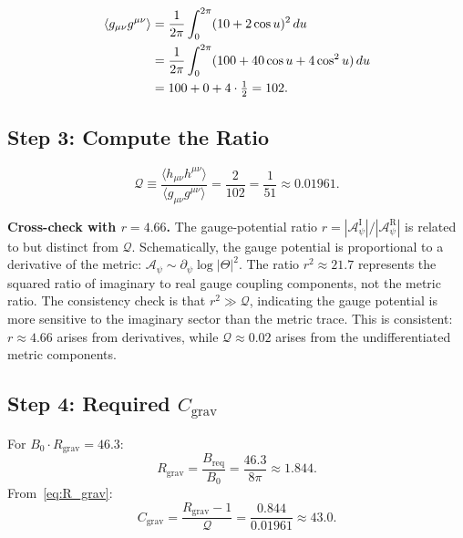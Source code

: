 \documentclass[11pt,a4paper]{article}
\theoremstyle{remark}
\begin{document}
\begin{align}
  \langle g_{\mu\nu}g^{\mu\nu}\rangle
    &= \frac{1}{2\pi}\int_0^{2\pi}(10 + 2\cos u)^2\,du \notag\\
    &= \frac{1}{2\pi}\int_0^{2\pi}(100 + 40\cos u + 4\cos^2 u)\,du \notag\\
    &= 100 + 0 + 4\cdot\tfrac{1}{2} = 102.
  \label{eq:gg_result}
\end{align}

\subsection{Step 3: Compute the Ratio}

\begin{equation}
  \mathcal{Q} \equiv \frac{\langle h_{\mu\nu}h^{\mu\nu}\rangle}
    {\langle g_{\mu\nu}g^{\mu\nu}\rangle}
  = \frac{2}{102} = \frac{1}{51} \approx 0.01961.
  \label{eq:Q_ratio}
\end{equation}

\textbf{Cross-check with $r = 4.66$.}
The gauge-potential ratio $r = |\mathcal{A}^\mathrm{I}_\psi|/|\mathcal{A}^\mathrm{R}_\psi|$ is
related to but distinct from $\mathcal{Q}$. Schematically, the gauge potential is proportional
to a derivative of the metric: $\mathcal{A}_\psi \sim \partial_\psi \log|\Theta|^2$. The ratio
$r^2 \approx 21.7$ represents the squared ratio of imaginary to real gauge coupling components,
not the metric ratio. The consistency check is that $r^2 \gg \mathcal{Q}$, indicating the
gauge potential is more sensitive to the imaginary sector than the metric trace.
This is consistent: $r \approx 4.66$ arises from derivatives, while $\mathcal{Q} \approx 0.02$
arises from the undifferentiated metric components.

\subsection{Step 4: Required \texorpdfstring{$C_{\mathrm{grav}}$}{C\_grav}}

For $B_0 \cdot R_{\mathrm{grav}} = 46.3$:
\begin{equation}
  R_{\mathrm{grav}} = \frac{B_{\mathrm{req}}}{B_0} = \frac{46.3}{8\pi} \approx 1.844.
  \label{eq:R_grav_required}
\end{equation}
From~\eqref{eq:R_grav}:
\begin{equation}
  C_{\mathrm{grav}} = \frac{R_{\mathrm{grav}} - 1}{\mathcal{Q}}
    = \frac{0.844}{0.01961} \approx 43.0.
  \label{eq:C_grav_required}
\end{equation}
\end{document}
